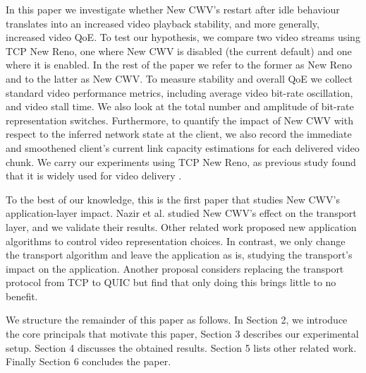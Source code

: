 \documentclass[10pt,sigconf]{acmart}
\begin{document}
In this paper we investigate whether New CWV's restart after idle behaviour translates into an increased video playback stability, and more generally, increased video QoE. To test our hypothesis, we compare two video streams using TCP New Reno, one where New CWV is disabled (the current default) and one where it is enabled. In the rest of the paper we refer to the former as New Reno and to the latter as New CWV. To measure stability and overall QoE we collect standard video performance metrics, including average video bit-rate oscillation, and video stall time. We also look at the total number and amplitude of bit-rate representation switches. Furthermore, to quantify the impact of New CWV with respect to the inferred network state at the client, we also record the immediate and smoothened client's current link capacity estimations for each delivered video chunk. We carry our experiments using TCP New Reno, as previous study found that it is widely used for video delivery \cite{Mishra-2019-the-great-internet-tcp-congestion-control-census}.


To the best of our knowledge, this is the first paper that studies New CWV's application-layer impact. Nazir et al. \cite{Nazir-2014-performance-evaluation-congestion-window-validation-dash-newcwv} studied New CWV's effect on the transport layer, and we validate their results. Other related work proposed new application algorithms to control video representation choices\cite{Mok-2012-qdash,Huang-2015-A-buffer-based-approach-to-rate-adaptation-bba, Yin-2015-a-control-theoritic-approach}. In contrast, we only change the transport algorithm and leave the application as is, studying the transport's impact on the application. Another proposal considers replacing the transport protocol from TCP to QUIC \cite{Bhat-2017-not-so-quic} but find that only doing this brings little to no benefit. 


We structure the remainder of this paper as follows. In Section 2, we introduce the core principals that motivate this paper, Section 3 describes our experimental setup. Section 4 discusses the obtained results. Section 5 lists other related work. Finally Section 6 concludes the paper.
\end{document}
